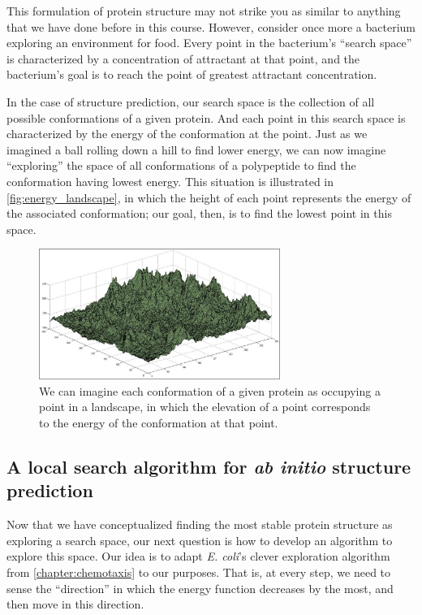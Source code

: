 This formulation of protein structure may not strike you as similar to anything that we have done before in this course. However, consider once more a bacterium exploring an environment for food. Every point in the bacterium's ``search space'' is characterized by a concentration of attractant at that point, and the bacterium's goal is to reach the point of greatest attractant concentration.

In the case of structure prediction, our search space is the collection of all possible conformations of a given protein. And each point in this search space is characterized by the energy of the conformation at the point. Just as we imagined a ball rolling down a hill to find lower energy, we can now imagine ``exploring'' the space of all conformations of a polypeptide to find the conformation having lowest energy. This situation is illustrated in \autoref{fig:energy_landscape}, in which the height of each point represents the energy of the associated conformation; our goal, then, is to find the lowest point in this space.\\

\begin{figure}[h]
	\centering
	\mySfFamily
	\includegraphics[width = 0.7\textwidth]{../images/energy_landscape.png}
	\caption{We can imagine each conformation of a given protein as occupying a point in a landscape, in which the elevation of a point corresponds to the energy of the conformation at that point.}
	\label{fig:energy_landscape}
\end{figure}

\FloatBarrier
{}
\subsection{A local search algorithm for \textit{ab initio} structure prediction}

Now that we have conceptualized finding the most stable protein structure as exploring a search space, our next question is how to develop an algorithm to explore this space. Our idea is to adapt \textit{E. coli}'s clever exploration algorithm from \autoref{chapter:chemotaxis} to our purposes. That is, at every step, we need to sense the ``direction'' in which the energy function decreases by the most, and then move in this direction.

